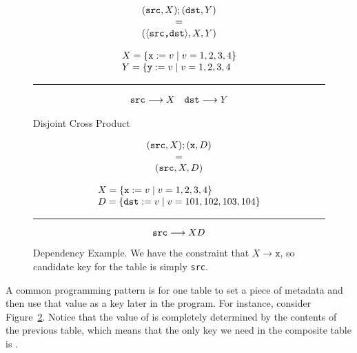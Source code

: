 \begin{figure}[ptb]
  \begin{minipage}{0.32\columnwidth}
  \[\begin{array}{c}
      (\texttt{src}, X); (\texttt{dst}, Y)
      \\ = \\
      (\langle\texttt{src,dst}\rangle, X, Y)
    \end{array} \]
\end{minipage} \hfill \vline \hfill \begin{minipage}{0.66\columnwidth}
  \[\begin{array}l
      X = \{\var x:=v \mid v = 1,2,3,4\}\\
      Y = \{\var y:=v \mid v = 1,2,3,4
    \end{array}\]
  \hrule
  \[\begin{array}{cc}
      \texttt{src} \longrightarrow X
      &\texttt{dst} \longrightarrow Y
    \end{array} \]
\end{minipage}
\caption{Disjoint Cross Product}
  \label{fig:cross-product-ex}
\end{figure}

\begin{figure}[ptb]
  \begin{minipage}{.33\columnwidth}
  \[\begin{array}{c}
      (\texttt{src}, X);
      (\texttt{x}, D)
      \\ = \\
      (\texttt{src}, X, D)
    \end{array}\]
\end{minipage}\hfill\vrule\hfill\begin{minipage}{.66\columnwidth}
  \[\begin{array}l
      X = \{\var x:=v \mid v = 1,2,3,4\}\\
      D = \{\var{dst} := v \mid v = 101,102,103,104\} \\
    \end{array}
  \]
  \hrule
  \[\texttt{src}\longrightarrow XD\]
\end{minipage}

\caption{Dependency Example. We have the constraint that
  $X \longrightarrow \texttt{x}$, so candidate key for the table is
  simply \texttt{src}.}
  \label{fig:dependency-ex}
\end{figure}

A common programming pattern is for one table to set a piece of
metadata and then use that value as a key later in the program. For
instance, consider Figure~\ref{fig:dependency-ex}. Notice that the
value of  is completely determined by the contents of the
previous table, which means that the only key we need in the composite
table is .

